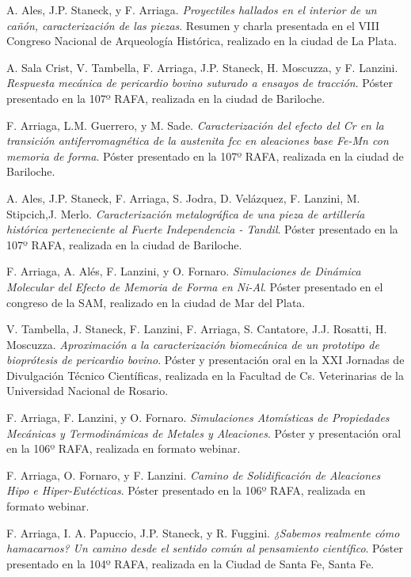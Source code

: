  A. Ales, J.P. Staneck, y F. Arriaga. \textit{Proyectiles hallados en el interior de un cañón, caracterización de las piezas}. Resumen y charla presentada en el VIII Congreso Nacional de Arqueología Histórica, realizado en la ciudad de La Plata.

 A. Sala Crist, V. Tambella, F. Arriaga, J.P. Staneck, H. Moscuzza, y F. Lanzini. \textit{Respuesta mecánica de pericardio bovino suturado a ensayos de tracción}. Póster presentado en la 107º RAFA, realizada en la ciudad de Bariloche.

 F. Arriaga, L.M. Guerrero, y M. Sade. \textit{Caracterización del efecto del Cr en la transición antiferromagnética de la austenita fcc en aleaciones base Fe-Mn con memoria de forma}. Póster presentado en la 107º RAFA, realizada en la ciudad de Bariloche.

 A. Ales, J.P. Staneck, F. Arriaga, S. Jodra, D. Velázquez, F. Lanzini, M. Stipcich,J. Merlo. \textit{Caracterización metalográfica de una pieza de artillería histórica perteneciente al Fuerte Independencia - Tandil}. Póster presentado en la 107º RAFA, realizada en la ciudad de Bariloche.

 F. Arriaga, A. Alés, F. Lanzini, y O. Fornaro. \textit{Simulaciones de Dinámica Molecular del Efecto de Memoria de Forma en Ni-Al}. Póster presentado en el congreso de la SAM, realizado en la ciudad de Mar del Plata.

 V. Tambella, J. Staneck, F. Lanzini, F. Arriaga, S. Cantatore, J.J. Rosatti, H. Moscuzza. \textit{Aproximación a la caracterización biomecánica de un prototipo de bioprótesis de pericardio bovino}. Póster y presentación oral en la XXI Jornadas de Divulgación Técnico Científicas, realizada en la Facultad de Cs. Veterinarias de la Universidad Nacional de Rosario.

 F. Arriaga, F. Lanzini, y O. Fornaro. \textit{Simulaciones Atomísticas de Propiedades Mecánicas y Termodinámicas de Metales y Aleaciones}. Póster y presentación oral en la 106º RAFA, realizada en formato webinar.

 F. Arriaga, O. Fornaro, y F. Lanzini. \textit{Camino de Solidificación de Aleaciones Hipo e Hiper-Eutécticas}. Póster presentado en la 106º RAFA, realizada en formato webinar.

 F. Arriaga, I. A. Papuccio, J.P. Staneck, y R. Fuggini. \textit{¿Sabemos realmente cómo hamacarnos? Un camino desde el sentido común al pensamiento científico}. Póster presentado en la 104º RAFA, realizada en la Ciudad de Santa Fe, Santa Fe.

